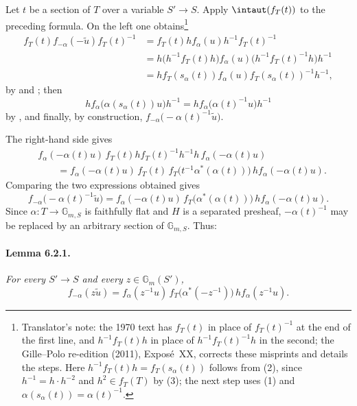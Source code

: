 Let \(t\) be a section of \(T\) over a variable \(S'\to S\).
Apply \(\intaut(f_T(t))\) to the preceding formula.  On the left one
obtains\footnote{Translator's note: the 1970 text has \(f_T(t)\) in place of \(f_T(t)^{-1}\) at the
end of the first line, and \(h^{-1}f_T(t)h\) in place of \(h^{-1}f_T(t)^{-1}h\) in the second; the
Gille--Polo re-edition (2011), Exposé~XX, corrects these misprints and details the steps. Here
\(h^{-1}f_T(t)h=f_T(s_\alpha(t))\) follows from \textup{(2)}, since \(h^{-1}=h\cdot h^{-2}\) and
\(h^2\in f_T(T)\) by \textup{(3)}; the next step uses \textup{(1)} and
\(\alpha(s_\alpha(t))=\alpha(t)^{-1}\).}
\[
\begin{aligned}
 f_T(t)f_{-\alpha}(-\widetilde u)f_T(t)^{-1}
 &=
 f_T(t)h f_\alpha(u)h^{-1}f_T(t)^{-1}\\
 &=
 h\bigl(h^{-1}f_T(t)h\bigr)f_\alpha(u)
   \bigl(h^{-1}f_T(t)^{-1}h\bigr)h^{-1}\\
 &=
 h f_T(s_\alpha(t))f_\alpha(u)
   f_T(s_\alpha(t))^{-1}h^{-1},
\end{aligned}
\]
by \textup{} and \textup{}; then
\[
 h f_\alpha\bigl(\alpha(s_\alpha(t))u\bigr)h^{-1}
 =h f_\alpha\bigl(\alpha(t)^{-1}u\bigr)h^{-1}
\]
by \textup{}, and finally, by construction,
\(f_{-\alpha}\bigl(-\alpha(t)^{-1}\widetilde u\bigr)\).

The right-hand side gives
\[
\begin{aligned}
 &f_\alpha(-\alpha(t)u)\,
 f_T(t)h f_T(t)^{-1}h^{-1}h\,
 f_\alpha(-\alpha(t)u)\\
 &\qquad=
 f_\alpha(-\alpha(t)u)\,f_T(t)\,
 f_T\bigl(t^{-1}\alpha^\ast(\alpha(t))\bigr)\,
 h f_\alpha(-\alpha(t)u).
\end{aligned}
\]
Comparing the two expressions obtained gives
\[
 f_{-\alpha}\bigl(-\alpha(t)^{-1}\widetilde u\bigr)
 =
 f_\alpha(-\alpha(t)u)\,
 f_T\bigl(\alpha^\ast(\alpha(t))\bigr)\,
 h f_\alpha(-\alpha(t)u).
\]
Since \(\alpha\colon T\to\mathbb G_{m,S}\) is faithfully flat and
\(H\) is a separated presheaf, \(-\alpha(t)^{-1}\) may be replaced
by an arbitrary section of \(\mathbb G_{m,S}\).  Thus:

\paragraph{\textbf{Lemma 6.2.1.}}
\emph{For every \(S'\to S\) and every
\(z\in\mathbb G_m(S')\),}
\[
 f_{-\alpha}(z\widetilde u)
 =
 f_\alpha(z^{-1}u)\,
 f_T\bigl(\alpha^\ast(-z^{-1})\bigr)\,
 h f_\alpha(z^{-1}u).
\]

